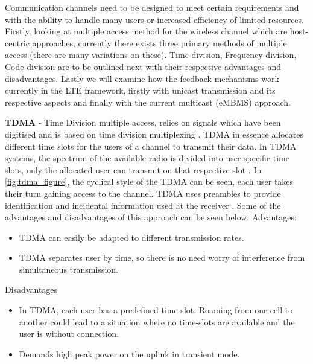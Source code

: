 \documentclass{article}
\begin{document}
Communication channels need to be designed to meet certain requirements and with the ability to handle many users or increased efficiency of limited resources. Firstly, looking at multiple access method for the wireless channel which are host-centric approaches, currently there exists three primary methods of multiple access (there are many variations on these). Time-division, Frequency-division, Code-division are to be outlined next with their respective advantages and disadvantages. Lastly we will examine how the feedback mechanisms work currently in the LTE framework, firstly with unicast transmission and its respective aspects and finally with the current multicast (eMBMS) approach. \newline

\textbf{TDMA} - Time Division multiple access,  relies on signals which have been digitised and is based on time division multiplexing \cite{tdma_info}. TDMA in essence allocates different time slots for the users of a channel to transmit their data. In TDMA systems, the spectrum of the available radio is divided into user specific time slots, only the allocated user can transmit on that respective slot \cite{tdma_info}. In \cref{fig:tdma_figure}, the cyclical style of the TDMA can be seen, each user takes their turn gaining access to the channel. TDMA uses preambles to provide identification and incidental information used at the receiver \cite{tdma_info}.
Some of the advantages and disadvantages of this approach can be seen below.\newline
Advantages:\
\begin{itemize}
    \item TDMA can easily be adapted to different transmission rates.
    \item TDMA separates user by time, so there is no need worry of interference from simultaneous transmission.
\end{itemize}
Disadvantages\newline
\begin{itemize}
    \item In TDMA, each user has a predefined time slot. Roaming from one cell to another could lead to a situation where no time-slots are available and the user is without connection.
    \item Demands high peak power on the uplink in transient mode.
\end{itemize}
\end{document}
